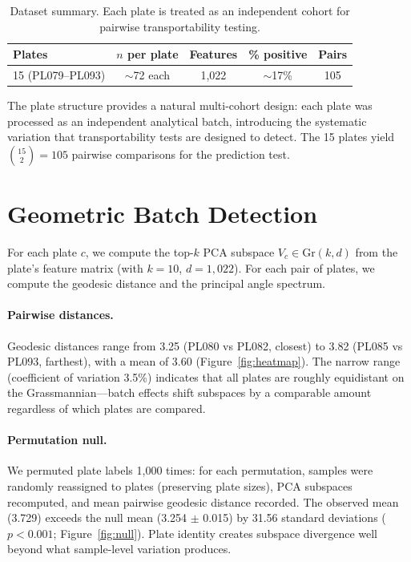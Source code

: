 \documentclass{article}
\begin{document}
\begin{table}[t]
\centering
\caption{Dataset summary. Each plate is treated as an independent cohort for pairwise transportability testing.}
\label{tab:cohorts}
\begin{tabular}{lcccc}
\toprule
Plates & $n$ per plate & Features & \% positive & Pairs \\
\midrule
15 (PL079--PL093) & $\sim$72 each & 1{,}022 & $\sim$17\% & 105 \\
\bottomrule
\end{tabular}
\end{table}

The plate structure provides a natural multi-cohort design: each plate was processed as an independent analytical batch, introducing the systematic variation that transportability tests are designed to detect. The 15 plates yield $\binom{15}{2} = 105$ pairwise comparisons for the prediction test.


\section{Geometric Batch Detection}
\label{sec:batch}

For each plate $c$, we compute the top-$k$ PCA subspace $V_c \in \mathrm{Gr}(k, d)$ from the plate's feature matrix (with $k = 10$, $d = 1{,}022$). For each pair of plates, we compute the geodesic distance and the principal angle spectrum.

\paragraph{Pairwise distances.} Geodesic distances range from 3.25 (PL080 vs PL082, closest) to 3.82 (PL085 vs PL093, farthest), with a mean of 3.60 (Figure~\ref{fig:heatmap}). The narrow range (coefficient of variation 3.5\%) indicates that all plates are roughly equidistant on the Grassmannian---batch effects shift subspaces by a comparable amount regardless of which plates are compared.

\paragraph{Permutation null.} We permuted plate labels 1{,}000 times: for each permutation, samples were randomly reassigned to plates (preserving plate sizes), PCA subspaces recomputed, and mean pairwise geodesic distance recorded. The observed mean (3.729) exceeds the null mean (3.254 $\pm$ 0.015) by 31.56 standard deviations ($p < 0.001$; Figure~\ref{fig:null}). Plate identity creates subspace divergence well beyond what sample-level variation produces.
\end{document}
